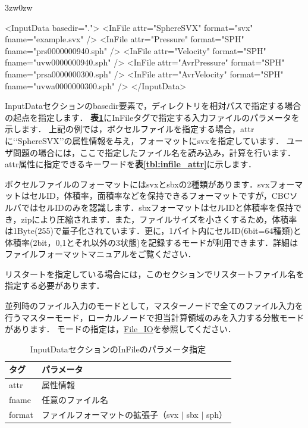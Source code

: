 \begin{indentation}{3zw}{0zw}

{\small
\begin{program}
<InputData basedir=".">
  <InFile attr="SphereSVX"    format="svx" fname="example.svx" />
  <InFile attr="Pressure"     format="SPH" fname="prs0000000940.sph" />
  <InFile attr="Velocity"     format="SPH" fname="uvw0000000940.sph" />
  <InFile attr="AvrPressure"  format="SPH" fname="prsa0000000300.sph" />
  <InFile attr="AvrVelocity"  format="SPH" fname="uvwa0000000300.sph" />
</InputData>
\end{program}
}

InputDataセクションのbasedir要素で，ディレクトリを相対パスで指定する場合の起点を指定します．
\textbf{表\ref{tbl:infile}}にInFileタグで指定する入力ファイルのパラメータを示します．
上記の例では，ボクセルファイルを指定する場合，attrに\lq\lq SphereSVX\rq\rq の属性情報を与え，フォーマットにsvxを指定しています．
ユーザ問題の場合には，ここで指定したファイル名を読み込み，計算を行います．attr属性に指定できるキーワードを\textbf{表\ref{tbl:infile_attr}}に示します．

ボクセルファイルのフォーマットにはsvxとsbxの2種類があります．svxフォーマットはセルID，体積率，面積率などを保持できるフォーマットですが，CBCソルバではセルIDのみを認識します．sbxフォーマットはセルIDと体積率を保持でき，zipにより圧縮されます．また，ファイルサイズを小さくするため，体積率は1Byte(255)で量子化されています．更に，1バイト内にセルID(6bit=64種類)と体積率(2bit，0,1とそれ以外の3状態)を記録するモードが利用できます．詳細はファイルフォーマットマニュアルをご覧ください．

リスタートを指定している場合には，このセクションでリスタートファイル名を指定する必要があります．

並列時のファイル入力のモードとして，マスターノードで全てのファイル入力を行うマスターモード，ローカルノードで担当計算領域のみを入力する分散モードがあります．
モードの指定は，\hyperlink{tgt:fileio}{File\_IO}を参照してください．

\begin{table}[htdp]
\caption{InputDataセクションのInFileのパラメータ指定}
\begin{center}
\small
\begin{tabular}{ll} \toprule
タグ & パラメータ\\ \midrule
attr & 属性情報\\
fname & 任意のファイル名\\
format & ファイルフォーマットの拡張子（svx $|$ sbx $|$ sph）\\ \bottomrule
\end{tabular}
\end{center}
\label{tbl:infile}
\end{table}


\end{indentation}
